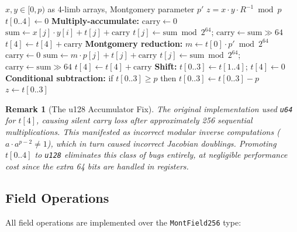 \documentclass[11pt,a4paper]{article}
\newtheorem{remark}{Remark}[section]
\begin{document}
\begin{algorithm}[H]
\caption{4-Limb Montgomery CIOS Multiplication}
\label{alg:cios}
\begin{algorithmic}[1]
\Require $x, y \in [0, p)$ as 4-limb arrays, Montgomery parameter $p'$
\Ensure $z = x \cdot y \cdot R^{-1} \bmod p$
\State $t[0..4] \gets 0$ 
    \State \textbf{Multiply-accumulate:} $\mathrm{carry} \gets 0$
        \State $\mathrm{sum} \gets x[j] \cdot y[i] + t[j] + \mathrm{carry}$ 
        \State $t[j] \gets \mathrm{sum} \bmod 2^{64}$; \quad $\mathrm{carry} \gets \mathrm{sum} \gg 64$
    \EndFor
    \State $t[4] \gets t[4] + \mathrm{carry}$
    \State \textbf{Montgomery reduction:} $m \gets t[0] \cdot p' \bmod 2^{64}$
    \State $\mathrm{carry} \gets 0$
        \State $\mathrm{sum} \gets m \cdot p[j] + t[j] + \mathrm{carry}$
        \State $t[j] \gets \mathrm{sum} \bmod 2^{64}$; \quad $\mathrm{carry} \gets \mathrm{sum} \gg 64$
    \EndFor
    \State $t[4] \gets t[4] + \mathrm{carry}$
    \State \textbf{Shift:} $t[0..3] \gets t[1..4]$; \quad $t[4] \gets 0$
\EndFor
\State \textbf{Conditional subtraction:} if $t[0..3] \geq p$ then $t[0..3] \gets t[0..3] - p$
\State \Return $z \gets t[0..3]$
\end{algorithmic}
\end{algorithm}

\begin{remark}[The u128 Accumulator Fix]
The original implementation used \texttt{u64} for $t[4]$, causing silent carry loss after approximately 256 sequential multiplications. This manifested as incorrect modular inverse computations ($a \cdot a^{p-2} \neq 1$), which in turn caused incorrect Jacobian doublings. Promoting $t[0..4]$ to \texttt{u128} eliminates this class of bugs entirely, at negligible performance cost since the extra 64 bits are handled in registers.
\end{remark}

\subsection{Field Operations}

All field operations are implemented over the \texttt{MontField256} type:
\end{document}
